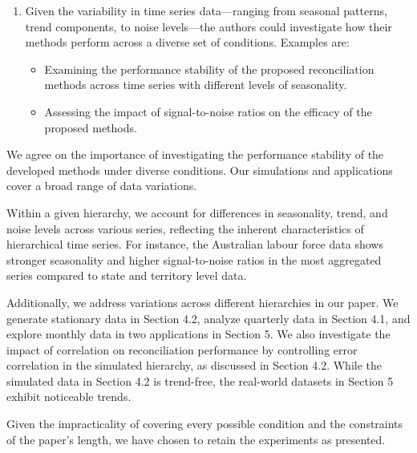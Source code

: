\documentclass[11pt,a4paper,]{article}
\providecommand{\tightlist}{%
  \setlength{\itemsep}{0pt}\setlength{\parskip}{0pt}}
\renewenvironment{quote}
               {\list{}{\rightmargin\leftmargin}%
                \item\relax\color[RGB]{0,150,0}}
               {\endlist}
\begin{document}
\begin{enumerate}
\def\labelenumi{\arabic{enumi}.}
\setcounter{enumi}{4}
\tightlist
\item
  Given the variability in time series data---ranging from seasonal
  patterns, trend components, to noise levels---the authors could
  investigate how their methods perform across a diverse set of
  conditions. Examples are:

  \begin{itemize}
  \tightlist
  \item
    Examining the performance stability of the proposed reconciliation
    methods across time series with different levels of seasonality.
  \item
    Assessing the impact of signal-to-noise ratios on the efficacy of
    the proposed methods.
  \end{itemize}
\end{enumerate}

\begin{quote}
We agree on the importance of investigating the performance stability of
the developed methods under diverse conditions. Our simulations and
applications cover a broad range of data variations.

Within a given hierarchy, we account for differences in seasonality,
trend, and noise levels across various series, reflecting the inherent
characteristics of hierarchical time series. For instance, the
Australian labour force data shows stronger seasonality and higher
signal-to-noise ratios in the most aggregated series compared to state
and territory level data.

Additionally, we address variations across different hierarchies in our
paper. We generate stationary data in Section 4.2, analyze quarterly
data in Section 4.1, and explore monthly data in two applications in
Section 5. We also investigate the impact of correlation on
reconciliation performance by controlling error correlation in the
simulated hierarchy, as discussed in Section 4.2. While the simulated
data in Section 4.2 is trend-free, the real-world datasets in Section 5
exhibit noticeable trends.

Given the impracticality of covering every possible condition and the
constraints of the paper's length, we have chosen to retain the
experiments as presented.
\end{quote}
\end{document}
